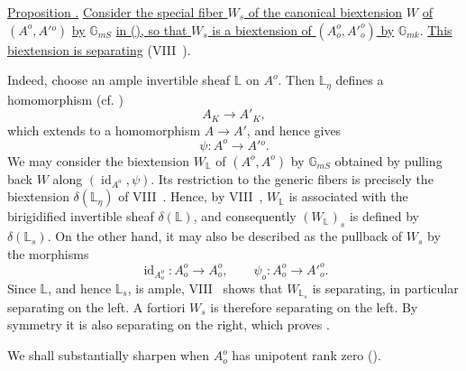 \medskip
\noindent
\underline{Proposition .} \underline{Consider the special fiber
$W_s$ of the canonical biextension} $W$ \underline{of}
$(A^o,A'{}^o)$ \underline{by} $\mathbb G_{mS}$ \underline{in (),
so that $W_s$ is a biextension of $(A_o^o,{A'}_o^o)$ by}
$\mathbb G_{mk}$.  \underline{This biextension is separating}
(VIII~).

Indeed, choose an ample invertible sheaf $\mathbb L$ on $A^o$.  Then
$\mathbb L_\eta$ defines a homomorphism (cf. )
\[
 A_K\longrightarrow A'_K,
\]
which extends to a homomorphism $A\longrightarrow A'$, and hence gives
\[
 \psi:A^o\longrightarrow A'{}^o.
\]
We may consider the biextension $W_{\mathbb L}$ of $(A^o,A^o)$ by
$\mathbb G_{mS}$ obtained by pulling back $W$ along
$(\operatorname{id}_{A^o},\psi)$.  Its restriction to the generic
fibers is precisely the biextension $\delta(\mathbb L_\eta)$ of
VIII~.  Hence, by VIII~, $W_{\mathbb L}$ is associated with the
birigidified invertible sheaf $\delta(\mathbb L)$, and consequently
$(W_{\mathbb L})_s$ is defined by $\delta(\mathbb L_s)$.  On the other
hand, it may also be described as the pullback of $W_s$ by the
morphisms
\[
 \operatorname{id}_{A_o^o}:A_o^o\longrightarrow A_o^o,
 \qquad
 \psi_o:A_o^o\longrightarrow {A'}_o^o.
\]
Since $\mathbb L$, and hence $\mathbb L_s$, is ample, VIII~ shows
that $W_{\mathbb L_s}$ is separating, in particular separating on the
left.  A fortiori $W_s$ is therefore separating on the left.  By
symmetry it is also separating on the right, which proves .

We shall substantially sharpen  when $A_o^o$ has unipotent rank
zero ().
